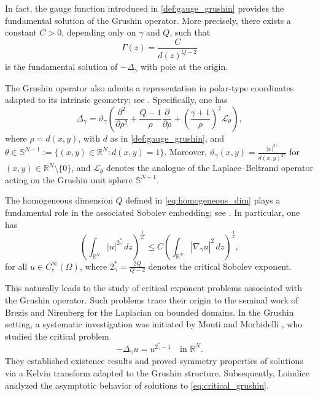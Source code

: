 \documentclass[11pt]{article}
\newcommand{\Gr}{\Delta_{\gamma}}
\begin{document}
In fact, the gauge function introduced in \eqref{def:gauge_grushin} provides the fundamental solution of the Grushin operator. More precisely, there exists a constant $C > 0$, depending only on $\gamma$ and $Q$, such that
\begin{equation*}
    \Gamma(z) = \frac{C}{d(z)^{Q-2}}
\end{equation*}
is the fundamental solution of $-\Delta_\gamma$ with pole at the origin.

The Grushin operator also admits a representation in polar-type coordinates adapted to its intrinsic geometry; see \cite{garofalo_grushin_polar}. Specifically, one has
\begin{equation*}
\Gr = \vartheta_{\gamma} \left( \frac{\partial^2}{\partial \rho^2} + \frac{Q-1}{\rho} \frac{\partial}{\partial \rho} + \left(\frac{\gamma + 1}{\rho}\right)^2 \mathcal{L}_{\theta} \right),
\end{equation*}
where $\rho = d(x,y)$, with $d$ as in \eqref{def:gauge_grushin}, and $\theta \in \mathbb{S}^{N-1} := \{ (x,y) \in \mathbb{R}^N : d(x,y) = 1 \}$. Moreover, $\vartheta_{\gamma}(x,y) = \frac{|x|^{2\gamma}}{d(x,y)^{2\gamma}}$ for $(x,y) \in \mathbb{R}^N \setminus \{0\}$, and $\mathcal{L}_{\theta}$ denotes the analogue of the Laplace--Beltrami operator acting on the Grushin unit sphere $\mathbb{S}^{N-1}$.

The homogeneous dimension $Q$ defined in \eqref{eq:homogeneous_dim} plays a fundamental role in the associated Sobolev embedding; see \cite{monti_morbidelli_grushin}. In particular, one has
\begin{equation*}
    \left( \int_{\mathbb{R}^N} |u|^{2_{\gamma}^*}\, dz \right)^{\frac{1}{2_{\gamma}^*}} 
    \leq C \left( \int_{\mathbb{R}^N} |\nabla_{\gamma} u|^2 \, dz \right)^{\frac{1}{2}},
\end{equation*}
for all $u \in C_c^{\infty}(\Omega)$, where $2_{\gamma}^* = \frac{2Q}{Q-2}$ denotes the critical Sobolev exponent.

This naturally leads to the study of critical exponent problems associated with the Grushin operator. Such problems trace their origin to the seminal work of Brezis and Nirenberg \cite{brezis_1983} for the Laplacian on bounded domains. In the Grushin setting, a systematic investigation was initiated by Monti and Morbidelli \cite{monti_morbidelli_grushin}, who studied the critical problem
\begin{equation}\label{eq:critical_grushin}
    - \Gr u = u^{2_{\gamma}^* - 1} \quad \text{in } \mathbb{R}^N.
\end{equation}
They established existence results and proved symmetry properties of solutions via a Kelvin transform adapted to the Grushin structure. Subsequently, Loiudice \cite{loiudice_asymtotic_behaviour} analyzed the asymptotic behavior of solutions to \eqref{eq:critical_grushin}.
\end{document}
